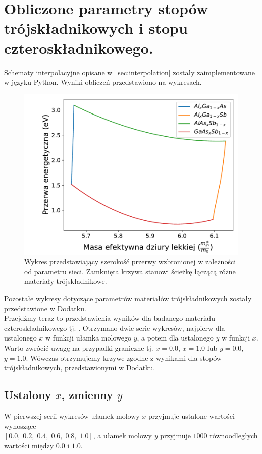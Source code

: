 \documentclass[12pt,openany,a4paper]{book}
\begin{document}
\section{Obliczone parametry stopów trójskładnikowych i stopu czteroskładnikowego.}

Schematy interpolacyjne opisane w~\ref{sec:interpolation} zostały zaimplementowane w języku Python.
Wyniki obliczeń przedstawiono na wykresach.\\

\begin{figure}[H]
	\centering
	\includegraphics[width = \linewidth]{Figures/ternary/Eg_alc.pdf}
	\caption{Wykres przedstawiający szerokość przerwy wzbronionej w zależności od parametru sieci.
	Zamknięta krzywa stanowi ścieżkę łączącą różne materiały trójskładnikowe.}\label{fig:Eg_alc}
\end{figure}
\pagebreak
Pozostałe wykresy dotyczące parametrów materiałów trójskładnikowych zostały przedstawione w \hyperref[chapt:dodatek]{Dodatku}.\\

Przejdźmy teraz to przedstawienia wyników dla badanego materiału 
czteroskładnikowego tj. . 
Otrzymano dwie serie wykresów, najpierw dla ustalonego \(x\) w funkcji ułamka
molowego \(y\), a potem dla ustalonego \(y\) w funkcji \(x\). Warto zwrócić uwagę
na przypadki graniczne tj. \(x = 0.0\), \(x =  1.0\) lub \(y = 0.0\), \(y =  1.0\). Wówczas otrzymujemy
krzywe zgodne z wynikami dla stopów trójskładnikowych, przedstawionymi w \hyperref[chapt:dodatek]{Dodatku}.

\subsection{Ustalony \(x\), zmienny \(y\)}
W pierwszej serii wykresów ułamek molowy \(x\) przyjmuje ustalone
wartości wynoszące\\
 \([0.0,\;0.2,\; 0.4,\; 0.6,\; 0.8,\; 1.0]\), a ułamek molowy \(y\)
przyjmuje \(1000\) równoodległych wartości między \(0.0\) i \(1.0\).
\end{document}

